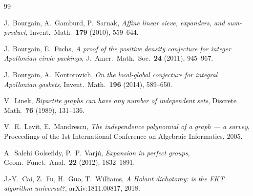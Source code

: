 \documentclass[11pt,a4paper]{article}
\theoremstyle{definition}
\theoremstyle{remark}
\begin{document}
\begin{thebibliography}{99}

J.~Bourgain, A.~Gamburd, P.~Sarnak,
\emph{Affine linear sieve, expanders, and sum-product},
Invent.\ Math.\ \textbf{179} (2010), 559--644.

J.~Bourgain, E.~Fuchs,
\emph{A proof of the positive density conjecture for integer Apollonian circle packings},
J.~Amer.\ Math.\ Soc.\ \textbf{24} (2011), 945--967.

J.~Bourgain, A.~Kontorovich,
\emph{On the local-global conjecture for integral Apollonian gaskets},
Invent.\ Math.\ \textbf{196} (2014), 589--650.

V.~Linek,
\emph{Bipartite graphs can have any number of independent sets},
Discrete Math.\ \textbf{76} (1989), 131--136.

V.~E.~Levit, E.~Mandrescu,
\emph{The independence polynomial of a graph --- a survey},
Proceedings of the 1st International Conference on Algebraic Informatics, 2005.

A.~Salehi Golsefidy, P.~P.~Varj\'u,
\emph{Expansion in perfect groups},
Geom.\ Funct.\ Anal.\ \textbf{22} (2012), 1832--1891.

J.-Y.~Cai, Z.~Fu, H.~Guo, T.~Williams,
\emph{A Holant dichotomy: is the FKT algorithm universal?},
arXiv:1811.00817, 2018.

\end{thebibliography}
\end{document}
